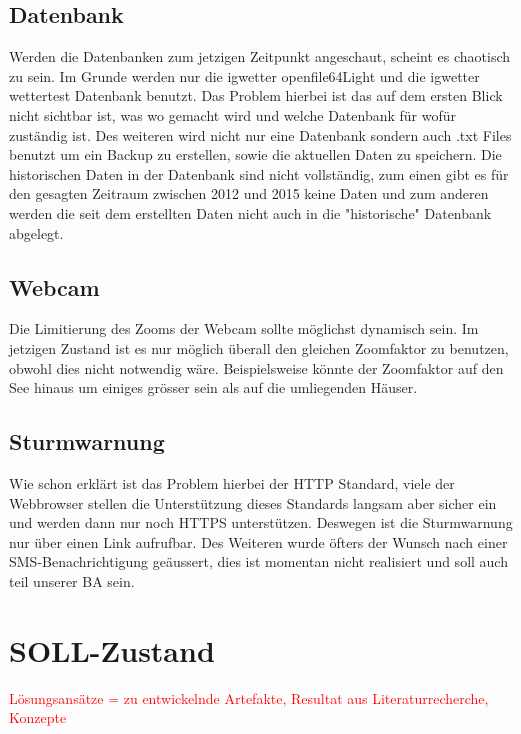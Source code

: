 \documentclass[a4paper,ngerman, 11pt, pagesize]{report}
\newcommand\Diskussionspunkt[1]{\textcolor{red}{#1}}
\begin{document}
\subsection{Datenbank}
Werden die Datenbanken zum jetzigen Zeitpunkt angeschaut, scheint es chaotisch zu sein. Im Grunde werden nur die igwetter openfile64Light und die igwetter wettertest Datenbank benutzt. Das Problem hierbei ist das auf dem ersten Blick nicht sichtbar ist, was wo gemacht wird und welche Datenbank für wofür zuständig ist. Des weiteren wird nicht nur eine Datenbank sondern auch .txt Files benutzt um ein Backup zu erstellen, sowie die aktuellen Daten zu speichern. Die historischen Daten in der Datenbank sind nicht vollständig, zum einen gibt es für den gesagten Zeitraum zwischen 2012 und 2015 keine Daten und zum anderen werden die seit dem erstellten Daten nicht auch in die "historische" Datenbank abgelegt.

\subsection{Webcam}
Die Limitierung des Zooms der Webcam sollte möglichst dynamisch sein. Im jetzigen Zustand ist es nur möglich überall den gleichen Zoomfaktor zu benutzen, obwohl dies nicht notwendig wäre. Beispielsweise könnte der Zoomfaktor auf den See hinaus um einiges grösser sein als auf die umliegenden Häuser.

\subsection{Sturmwarnung}
Wie schon erklärt ist das Problem hierbei der HTTP Standard, viele der Webbrowser stellen die Unterstützung dieses Standards langsam aber sicher ein und werden dann nur noch HTTPS unterstützen\cite{Mozilla:DeprecatingNon-SecureHTTP}. Deswegen ist die Sturmwarnung nur über einen Link aufrufbar. Des Weiteren wurde öfters der Wunsch nach einer SMS-Benachrichtigung geäussert, dies ist momentan nicht realisiert und soll auch teil unserer BA sein. 

\section{SOLL-Zustand}
\Diskussionspunkt{Lösungsansätze = zu entwickelnde Artefakte, 
Resultat aus Literaturrecherche, 
Konzepte}
\end{document}
